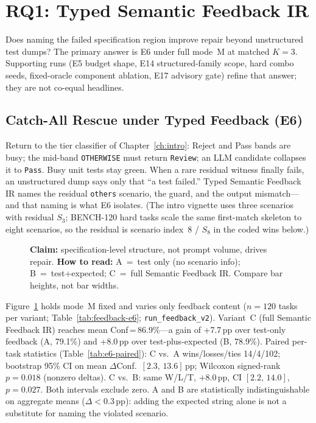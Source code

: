 \section{RQ1: Typed Semantic Feedback IR}
\label{sec:results:rq1}

Does naming the failed specification region improve repair beyond unstructured
test dumps?
The primary answer is E6 under full mode~M at matched $K{=}3$.
Supporting runs (E5 budget shape, E14 structured-family scope, hard combo
seeds, fixed-oracle component ablation, E17 advisory gate) refine that answer;
they are not co-equal headlines.

\subsection{Catch-All Rescue under Typed Feedback (E6)}
\label{sec:results:e6}

Return to the tier classifier of Chapter~\ref{ch:intro}: Reject and Pass bands
are busy; the mid-band \texttt{OTHERWISE} must return \texttt{Review}; an LLM
candidate collapses it to \texttt{Pass}.
Busy unit tests stay green.
When a rare residual witness finally fails, an unstructured dump says only
that ``a test failed.''
Typed Semantic Feedback IR names the residual \texttt{others} scenario, the
guard, and the output mismatch---and that naming is what E6 isolates.
(The intro vignette uses three scenarios with residual $S_3$; BENCH-120 hard
tasks scale the same first-match skeleton to eight scenarios, so the residual
is scenario index~8 / $S_8$ in the coded wins below.)

\begin{figure}[t]
  \centering
  \caption{\textbf{Claim:} specification-level structure, not prompt volume, drives
    repair.
    \textbf{How to read:} A~=~test only (no scenario info); B~=~test+expected;
    C~=~full Semantic Feedback IR.  Compare bar heights, not bar widths.}
  \label{fig:feedback-variant}
\end{figure}

Figure~\ref{fig:feedback-variant} holds mode~M fixed and varies only feedback
content ($n{=}120$ tasks per variant; Table~\ref{tab:feedback-e6};
\texttt{run\_feedback\_v2}).
Variant~C (full Semantic Feedback IR) reaches mean Conf\,=\,86.9\%---a gain of
+7.7\,pp over test-only feedback (A, 79.1\%) and +8.0\,pp over
test-plus-expected (B, 78.9\%).
Paired per-task statistics (Table~\ref{tab:e6-paired}): C vs.\ A
wins/losses/ties 14/4/102; bootstrap 95\% CI on mean $\Delta$Conf.\
$[2.3,\,13.6]$\,pp; Wilcoxon signed-rank $p{=}0.018$ (nonzero deltas).
C vs.\ B: same W/L/T, ${+}8.0$\,pp, CI $[2.2,\,14.0]$, $p{=}0.027$.
Both intervals exclude zero.
A and B are statistically indistinguishable on aggregate means
($\Delta < 0.3$\,pp): adding the expected string alone is not a substitute for
naming the violated scenario.

